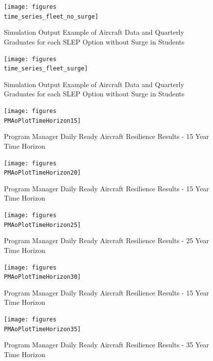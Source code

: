 \begin{figure}[h]
  \centering\texttt{[image: figures\\time\_series\_fleet\_no\_surge]}
  \caption{Simulation Output Example of Aircraft Data and Quarterly
    Graduates for each SLEP Option without Surge in Students}
  \label{f:ts_no_surge}
\end{figure}

\begin{figure}[h]
  \centering\texttt{[image: figures\\time\_series\_fleet\_surge]}
  \caption{Simulation Output Example of Aircraft Data and Quarterly
    Graduates for each SLEP Option without Surge in Students}
  \label{f:ts_surge}
\end{figure}

\begin{figure}[h]
  \centering\texttt{[image: figures\\PMAoPlotTimeHorizon15]}
  \caption{Program Manager Daily Ready Aircraft Resilience Results - 15 Year Time Horizon}
  \label{f:PMresultsAo15}
\end{figure}

\begin{figure}[h]
  \centering\texttt{[image: figures\\PMAoPlotTimeHorizon20]}
  \caption{Program Manager Daily Ready Aircraft Resilience Results - 15 Year Time Horizon}
  \label{f:PMresultsAo20}
\end{figure}

\begin{figure}[h]
  \centering\texttt{[image: figures\\PMAoPlotTimeHorizon25]}
  \caption{Program Manager Daily Ready Aircraft Resilience Results - 25 Year Time Horizon}
  \label{f:PMresultsAo25}
\end{figure}

\begin{figure}[h]
  \centering\texttt{[image: figures\\PMAoPlotTimeHorizon30]}
  \caption{Program Manager Daily Ready Aircraft Resilience Results - 15 Year Time Horizon}
  \label{f:PMresultsAo30}
\end{figure}

\begin{figure}[h]
  \centering\texttt{[image: figures\\PMAoPlotTimeHorizon35]}
  \caption{Program Manager Daily Ready Aircraft Resilience Results - 35 Year Time Horizon}
  \label{f:PMresultsAo35}
\end{figure}


